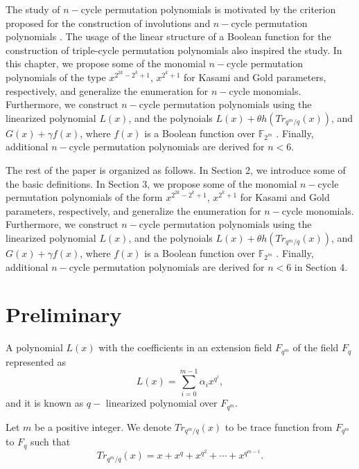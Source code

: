 \documentclass[12pt,a4paper]{article}
\begin{document}
The study of  $ n-$cycle permutation polynomials is motivated by the criterion proposed for the construction of involutions \cite{charpin2016involutions,mesnager2016constructions,charpin2015involutions,charpin2016dickson} and $ n-$cycle permutation polynomials \cite{chen2021constructions,niu2023more}. The usage of the linear structure of a Boolean function for the construction of triple-cycle permutation polynomials \cite{liu2019triple} also inspired the study.  In this chapter, we propose some of the monomial $ n-$cycle permutation polynomials of the type $ x^{2^{2k}-2^{k}+1} $, $ x^{2^{k}+1} $ for Kasami and Gold parameters, respectively, and generalize the enumeration for $ n-$cycle monomials. Furthermore, we construct $ n-$cycle permutation polynomials using the linearized polynomial $L(x) $, and the polynoials $ L(x)+\theta h(Tr_{q^{m}/q}(x))$, and $ G(x)+\gamma f(x) $, where $ f(x) $ is a Boolean function over $ \mathbb{F}_{2^{m}} $ . Finally, additional $ n-$cycle permutation polynomials are derived for $ n<6 $. 

The rest of the paper is organized as follows. In Section 2, we introduce some of the basic definitions. In Section 3, we propose some of the monomial $ n-$cycle permutation polynomials of the form $ x^{2^{2k}-2^{k}+1} $, $ x^{2^{k}+1} $ for Kasami and Gold parameters, respectively, and generalize the enumeration for $ n-$cycle monomials. Furthermore, we construct $ n-$cycle permutation polynomials using the linearized polynomial $L(x) $, and the polynoials $ L(x)+\theta h(Tr_{q^{m}/q}(x))$, and $ G(x)+\gamma f(x) $, where $ f(x) $ is a Boolean function over $ \mathbb{F}_{2^{m}} $ . Finally, additional $ n-$cycle permutation polynomials are derived for $ n<6 $ in Section 4. 


\section{Preliminary}
A polynomial $ L(x) $ with the coefficients in an extension field $F_{q^{m}}$ of the field $F_{q}$ represented as 
\begin{equation*}
	L(x)= \sum\limits_{i=0}^{m-1} \alpha_{i}x^{q^{i}},
\end{equation*}
and it is known as $ q- $ linearized polynomial over $F_{q^{m}}$.

Let $ m $ be a positive integer. We denote $ Tr_{q^{m}/q}(x) $ to be trace function from $ F_{q^{m}} $ to $ F_{q} $ such that 
\begin{equation}
	Tr_{q^{m}/q}(x)=x+x^{q}+x^{q^{2}}+\cdots+x^{q^{m-1}}.
\end{equation}
\end{document}
